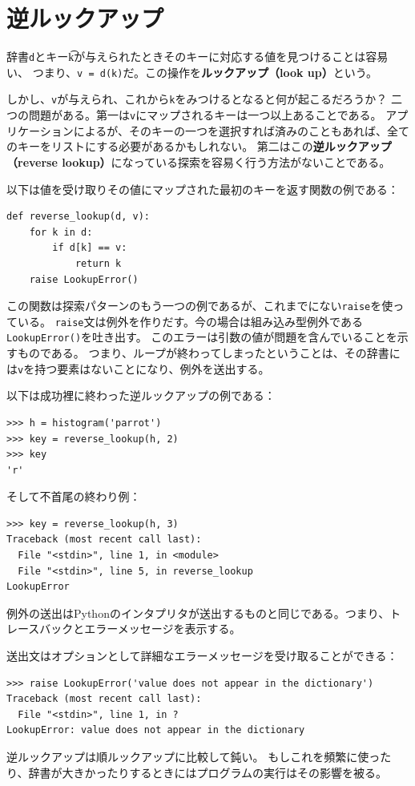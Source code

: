 \documentclass[a4j,12pt,makeidx]{jbook}
\begin{document}
\section{逆ルックアップ}
辞書{\tt d}とキー{\t k}が与えられたときそのキーに対応する値を見つけることは容易い、
つまり、{\tt v = d(k)}だ。この操作を{\bf ルックアップ（look up）}という。 \par
しかし、{\tt v}が与えられ、これから{\tt k}をみつけるとなると何が起こるだろうか？
二つの問題がある。第一は{\tt v}にマップされるキーは一つ以上あることである。
アプリケーションによるが、そのキーの一つを選択すれば済みのこともあれば、全てのキーをリストにする必要があるかもしれない。
第二はこの{\bf 逆ルックアップ（reverse lookup）}になっている探索を容易く行う方法がないことである。\par
以下は値を受け取りその値にマップされた最初のキーを返す関数の例である：
\begin{verbatim}
def reverse_lookup(d, v):
    for k in d:
        if d[k] == v:
            return k
    raise LookupError()
\end{verbatim}
この関数は探索パターンのもう一つの例であるが、これまでにない{\tt raise}を使っている。
{\tt raise}文は例外を作りだす。今の場合は組み込み型例外である{\tt LookupError()}を吐き出す。
このエラーは引数の値が問題を含んでいることを示すものである。
つまり、ループが終わってしまったということは、その辞書には{\tt v}を持つ要素はないことになり、例外を送出する。\par
以下は成功裡に終わった逆ルックアップの例である：
\begin{verbatim}
>>> h = histogram('parrot')
>>> key = reverse_lookup(h, 2)
>>> key
'r'
\end{verbatim}
そして不首尾の終わり例：
\begin{verbatim}
>>> key = reverse_lookup(h, 3)
Traceback (most recent call last):
  File "<stdin>", line 1, in <module>
  File "<stdin>", line 5, in reverse_lookup
LookupError
\end{verbatim}
例外の送出はPythonのインタプリタが送出するものと同じである。つまり、トレースバックとエラーメッセージを表示する。\par
送出文はオプションとして詳細なエラーメッセージを受け取ることができる：
\begin{verbatim}
>>> raise LookupError('value does not appear in the dictionary')
Traceback (most recent call last):
  File "<stdin>", line 1, in ?
LookupError: value does not appear in the dictionary
\end{verbatim}
逆ルックアップは順ルックアップに比較して鈍い。
もしこれを頻繁に使ったり、辞書が大きかったりするときにはプログラムの実行はその影響を被る。\\
\end{document}
